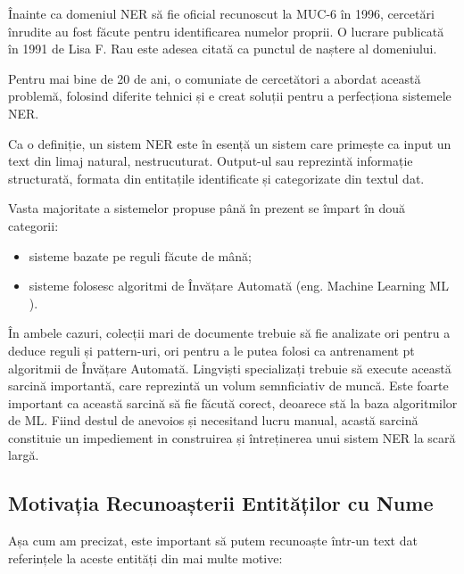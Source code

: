 Înainte ca domeniul NER să fie oficial recunoscut la MUC-6 în 1996, cercetări înrudite au fost făcute pentru identificarea numelor proprii. O lucrare publicată în 1991 de Lisa F. Rau este adesea citată ca punctul de naștere al domeniului.\cite{rau1991}

Pentru mai bine de 20 de ani, o comuniate de cercetători a abordat această problemă, folosind diferite tehnici și e creat soluții pentru a perfecționa sistemele NER.


Ca o definiție, un sistem NER este în esență un sistem care primește ca input un text din limaj natural, nestrucuturat. Output-ul sau reprezintă informație structurată, formata din entitațile identificate și categorizate din textul dat.


Vasta majoritate a sistemelor propuse până în prezent se împart în două categorii:

\begin{itemize}
\item sisteme bazate pe reguli făcute de mână;
\item sisteme folosesc algoritmi de Învățare Automată (eng. Machine Learning ML ).
\end{itemize}


În ambele cazuri, colecții mari de documente trebuie să fie analizate ori pentru a deduce reguli și pattern-uri, ori pentru a le putea folosi ca antrenament pt algoritmii de Învățare Automată. Lingviști specializați trebuie să execute această sarcină importantă, care reprezintă un volum semnficiativ de muncă. Este foarte important ca această sarcină să fie făcută corect, deoarece stă la baza algoritmilor de ML. Fiind destul de anevoios și necesitand lucru manual, acastă sarcină constituie un impediement in construirea și întreținerea unui sistem NER la scară largă.

\subsection{Motivația Recunoașterii Entităților cu Nume}

Așa cum am precizat, este important să putem recunoaște într-un text dat referințele la aceste entități din mai multe motive:

